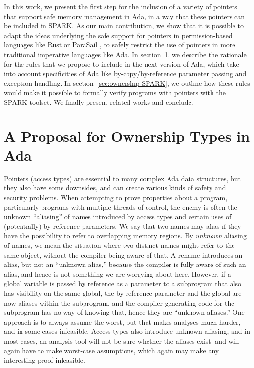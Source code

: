 \documentclass{llncs}
\begin{document}
In this work, we present the first step for the inclusion of a variety of pointers that support safe memory management in Ada, in a way that these pointers can be included in SPARK. As our main contribution, we show that it is possible to adapt the ideas underlying the safe support for pointers in permission-based languages like Rust \cite{Balasubramanian17} or ParaSail \cite{Taft11}, to safely restrict the use of pointers in more traditional imperative languages like Ada. In section~\ref{sec:ownership-Ada}, we describe the rationale for the rules that we propose to include in the next version of Ada, which take into account specificities of Ada like by-copy/by-reference parameter passing and exception handling. In section~\ref{sec:ownership-SPARK}, we outline how these rules would make it possible to formally verify programs with pointers with the SPARK toolset. We finally present related works and conclude.


\section{A Proposal for Ownership Types in Ada}
\label{sec:ownership-Ada}

Pointers (access types) are essential to many complex Ada data structures, but they also have some downsides, and can create various kinds of safety and security problems.
When attempting to prove properties about a program, particularly programs with multiple threads of control, the enemy is often the unknown ``aliasing'' of names introduced by
access types and certain uses of (potentially) by-reference parameters. We say that two names may alias if they have the possibility to refer to overlapping memory regions.
By \textit{unknown} aliasing of names, we mean the situation where two distinct names might refer to the same object, without the compiler being aware of that.  A rename introduces
an alias, but not an ``unknown alias,'' because the compiler is fully aware of such an alias, and hence is not something we are worrying about here. However, if a global
variable is passed by reference as a parameter to a subprogram that also has visibility on the same global, the by-reference parameter and the global are now aliases within
the subprogram, and the compiler generating code for the subprogram has no way of knowing that, hence they are ``unknown aliases.''  One approach is to always assume the worst,
but that makes analyses much harder, and in some cases infeasible. Access types also introduce unknown aliasing, and in most cases, an analysis tool will not be
sure whether the aliases exist, and will again have to make worst-case assumptions, which again may make any interesting proof infeasible.
\end{document}
